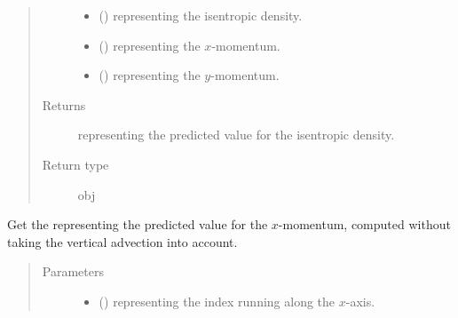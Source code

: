 \documentclass[letterpaper,10pt,english]{sphinxmanual}
\begin{document}
\begin{fulllineitems}
\begin{fulllineitems}
\begin{quote}
\begin{description}
\begin{itemize}
\item {} 
 () \textendash{}  representing the isentropic density.

\item {} 
 () \textendash{}  representing the \(x\)-momentum.

\item {} 
 () \textendash{}  representing the \(y\)-momentum.

\end{itemize}

\item[{Returns}] \leavevmode
{} representing the predicted value for the isentropic density.

\item[{Return type}] \leavevmode
obj

\end{description}\end{quote}

\end{fulllineitems}


\begin{fulllineitems}
\label{\detokenize{api:dycore.flux_isentropic_maccormack.FluxIsentropicMacCormack._get_maccormack_horizontal_predicted_value_momentum_x}}
Get the  representing the predicted value for the \(x\)-momentum,
computed without taking the vertical advection into account.
\begin{quote}\begin{description}
\item[{Parameters}] \leavevmode\begin{itemize}
\item {} 
 () \textendash{}  representing the index running along the \(x\)-axis.


\end{itemize}
\end{description}
\end{quote}
\end{fulllineitems}
\end{fulllineitems}
\end{document}
